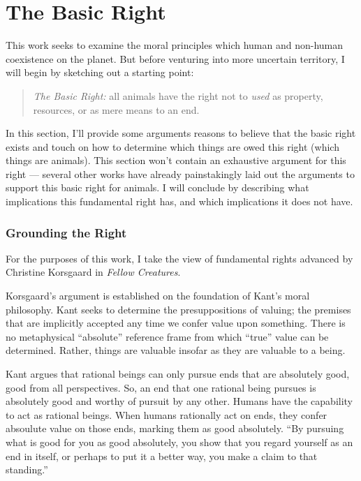 \chapter{The Basic Right}
	This work seeks to examine the moral principles which human and non-human
	coexistence on the planet.  But before venturing into more uncertain
	territory, I will begin by sketching out a starting point:

	\begin{quote}
		\emph{The Basic Right:} all animals have the right not to \emph{used}
	as property, resources, or as mere means to an end.  \end{quote}

	In this section, I’ll provide some arguments reasons to believe that the
	basic right exists and touch on how to determine which things are owed this
	right (which things are animals).  This section won’t contain an exhaustive
	argument for this right --- several other works have already painstakingly
	laid out the arguments to support this basic right for animals.  I will
	conclude by describing what implications this fundamental right has, and
	which implications it does not have.

	\subsection{Grounding the Right}
		
	For the purposes of this work, I take the view of fundamental rights
	advanced by Christine Korsgaard in \emph{Fellow Creatures}.\autocite{kors}

	Korsgaard’s argument is established on the foundation of Kant’s moral
	philosophy.  Kant seeks to determine the presuppositions of valuing; the
	premises that are implicitly accepted any time we confer value upon
	something.  There is no metaphysical “absolute” reference frame from which
	“true” value can be determined.  Rather, things are valuable insofar as
	they are valuable to a being.

	Kant argues that rational beings can only pursue ends that are absolutely
	good, good from all perspectives.\autocite[8.4.1]{kors} So, an end that one
	rational being pursues is absolutely good and worthy of pursuit by any
	other.  Humans have the capability to act as rational beings.  When humans
	rationally act on ends, they confer absoulute value on those ends, marking
	them as good absolutely.  “By pursuing what is good for you as good
	absolutely, you show that you regard yourself as an end in itself, or
	perhaps to put it a better way, you make a claim to that
	standing.”\autocite[8.4.4]{kors}

